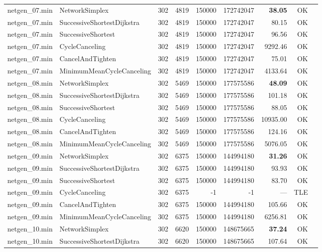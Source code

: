\begin{longtable}{llrrrrrrl}
\midrule
netgen\_07.min & NetworkSimplex & 302 & 4819 & 150000 & 172742047 & \textbf{38.05} & OK \\
netgen\_07.min & SuccessiveShortestDijkstra & 302 & 4819 & 150000 & 172742047 & 80.15 & OK \\
netgen\_07.min & SuccessiveShortest & 302 & 4819 & 150000 & 172742047 & 96.56 & OK \\
netgen\_07.min & CycleCanceling & 302 & 4819 & 150000 & 172742047 & 9292.46 & OK \\
netgen\_07.min & CancelAndTighten & 302 & 4819 & 150000 & 172742047 & 75.01 & OK \\
netgen\_07.min & MinimumMeanCycleCanceling & 302 & 4819 & 150000 & 172742047 & 4133.64 & OK \\
\midrule
netgen\_08.min & NetworkSimplex & 302 & 5469 & 150000 & 177575586 & \textbf{48.09} & OK \\
netgen\_08.min & SuccessiveShortestDijkstra & 302 & 5469 & 150000 & 177575586 & 101.18 & OK \\
netgen\_08.min & SuccessiveShortest & 302 & 5469 & 150000 & 177575586 & 88.05 & OK \\
netgen\_08.min & CycleCanceling & 302 & 5469 & 150000 & 177575586 & 10935.00 & OK \\
netgen\_08.min & CancelAndTighten & 302 & 5469 & 150000 & 177575586 & 124.16 & OK \\
netgen\_08.min & MinimumMeanCycleCanceling & 302 & 5469 & 150000 & 177575586 & 5076.05 & OK \\
\midrule
netgen\_09.min & NetworkSimplex & 302 & 6375 & 150000 & 144994180 & \textbf{31.26} & OK \\
netgen\_09.min & SuccessiveShortestDijkstra & 302 & 6375 & 150000 & 144994180 & 93.93 & OK \\
netgen\_09.min & SuccessiveShortest & 302 & 6375 & 150000 & 144994180 & 83.70 & OK \\
netgen\_09.min & CycleCanceling & 302 & 6375 & -1 & -1 & --- & TLE \\
netgen\_09.min & CancelAndTighten & 302 & 6375 & 150000 & 144994180 & 105.66 & OK \\
netgen\_09.min & MinimumMeanCycleCanceling & 302 & 6375 & 150000 & 144994180 & 6256.81 & OK \\
\midrule
netgen\_10.min & NetworkSimplex & 302 & 6620 & 150000 & 148675665 & \textbf{37.24} & OK \\
netgen\_10.min & SuccessiveShortestDijkstra & 302 & 6620 & 150000 & 148675665 & 107.64 & OK \\

\end{longtable}
